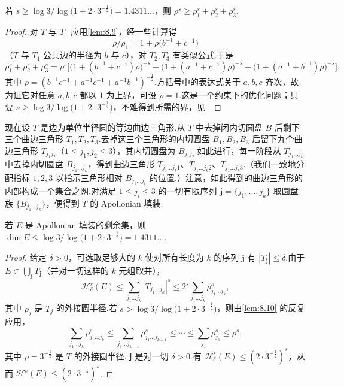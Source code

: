 \begin{lemma}\label{lem:8.10}
若 $s\geq\log 3/\log\bigl(1+2\cdot 3^{-\frac{1}{2}}\bigr)=1.4311\ldots$，则 $\rho^{s}\geq\rho_1^{s}+\rho_2^{s}+\rho_3^{s}$.
\end{lemma}

\begin{proof}
对 $T$ 与 $T_1$ 应用\cref{lem:8.9}，经一些计算得
\[
  \rho/\rho_1=1+\rho\bigl(b^{-1}+c^{-1}\bigr)
\]
（$T$ 与 $T_1$ 公共边的半径为 $b$ 与 $c$），对 $T_2,T_3$ 有类似公式.于是
\[
  \rho_1^{s}+\rho_2^{s}+\rho_3^{s}
  =\rho^{s}\bigl[\bigl(1+(b^{-1}+c^{-1})\rho\bigr)^{-s}+\bigl(1+(a^{-1}+c^{-1})\rho\bigr)^{-s}
  +\bigl(1+(a^{-1}+b^{-1})\rho\bigr)^{-s}\bigr],
\]
其中 $\rho=(b^{-1}c^{-1}+a^{-1}c^{-1}+a^{-1}b^{-1})^{-\frac{1}{2}}$.方括号中的表达式关于 $a,b,c$ 齐次，故为证它对任意 $a,b,c$ 都以 $1$ 为上界，可设 $\rho=1$.这是一个约束下的优化问题；只要 $s\geq\log 3/\log\bigl(1+2\cdot 3^{-\frac{1}{2}}\bigr)$，不难得到所需的界，见 \textcite{hirst1967}.
\end{proof}

现在设 $T$ 是边为单位半径圆的等边曲边三角形.从 $T$ 中去掉闭内切圆盘 $B$ 后剩下三个曲边三角形 $T_1,T_2,T_3$.去掉这三个三角形的内切圆盘 $B_1,B_2,B_3$ 后留下九个曲边三角形 $T_{j_1j_2}$（$1\leq j_1,j_2\leq 3$），其内切圆盘为 $B_{j_1j_2}$.如此进行，每一阶段从 $T_{j_1\ldots j_k}$ 中去掉内切圆盘 $B_{j_1\ldots j_k}$，得到曲边三角形 $T_{j_1\ldots j_k1}$、$T_{j_1\ldots j_k2}$、$T_{j_1\ldots j_k3}$.（我们一致地分配指标 $1,2,3$ 以指示三角形相对 $B_{j_1\ldots j_k}$ 的位置.）注意，如此得到的曲边三角形的内部构成一个集合之网.对满足 $1\leq j_i\leq 3$ 的一切有限序列 $\mathbf{j}=\{j_1,\ldots,j_k\}$ 取圆盘族 $\{B_{j_1\ldots j_k}\}$，便得到 $T$ 的 Apollonian 填装.

\begin{theorem}\label{thm:8.11}
若 $E$ 是 Apollonian 填装的剩余集，则 $\dim E\leq\log 3/\log\bigl(1+2\cdot 3^{-\frac{1}{2}}\bigr)=1.4311\ldots$.
\end{theorem}

\begin{proof}
给定 $\delta>0$，可选取足够大的 $k$ 使对所有长度为 $k$ 的序列 $\mathbf{j}$ 有 $|T_{\mathbf{j}}|\leq\delta$.由于 $E\subset\bigcup_{\mathbf{j}}T_{\mathbf{j}}$（并对一切这样的 $k$ 元组取并），
\[
  \mathcal{H}^{s}_{\delta}(E)\leq\sum_{j_1\ldots j_k}|T_{j_1\ldots j_k}|^{s}\leq 2^{s}\sum_{j_1\ldots j_k}\rho_{j_1\ldots j_k}^{s},
\]
其中 $\rho_j$ 是 $T_j$ 的外接圆半径.若 $s>\log 3/\log\bigl(1+2\cdot 3^{-\frac{1}{2}}\bigr)$，则由\cref{lem:8.10} 的反复应用，
\[
  \sum_{j_1\ldots j_k}\rho_{j_1\ldots j_k}^{s}
  \leq\sum_{j_1\ldots j_{k-1}}\rho_{j_1\ldots j_{k-1}}^{s}
  \leq\cdots\leq\sum_{j_1}\rho_{j_1}^{s}\leq\rho^{s},
\]
其中 $\rho=3^{-\frac{1}{2}}$ 是 $T$ 的外接圆半径.于是对一切 $\delta>0$ 有 $\mathcal{H}^s_{\delta}(E)\leq(2\cdot 3^{-\frac{1}{2}})^{s}$，从而 $\mathcal{H}^s(E)\leq(2\cdot 3^{-\frac{1}{2}})^{s}$.
\end{proof}

